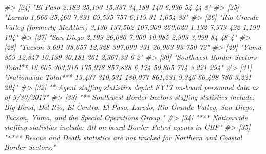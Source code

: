 \documentclass[
  12pt,
]{book}
\newenvironment{Shaded}{\begin{snugshade}}{\end{snugshade}}
\newcommand{\CommentTok}[1]{\textcolor[rgb]{0.37,0.37,0.37}{\textit{#1}}}
\begin{document}
\begin{Shaded}
\begin{Highlighting}[]
\CommentTok{\#> [24] "El Paso                                          2,182             25,193                   15,337                  34,189             140             6,996             54            44      8"    }
\CommentTok{\#> [25] "Laredo                                           1,666             25,460                    7,891                  69,535             757             6,119             31          1,054    83"    }
\CommentTok{\#> [26] "Rio Grande Valley (formerly McAllen)             3,130            137,562                  107,909                260,020             1,192            7,979            422          1,190   104"    }
\CommentTok{\#> [27] "San Diego                                        2,199             26,086                    7,060                  10,985            2,903            3,099             84            48      4"    }
\CommentTok{\#> [28] "Tucson                                           3,691             38,657                   12,328                397,090              331            20,963             93           750     72"    }
\CommentTok{\#> [29] "Yuma                                              859              12,847                   10,139                  30,181             261             2,367             33             6      2"    }
\CommentTok{\#> [30] "Southwest Border Sectors Total**                16,605            303,916                  175,978                857,888             6,174           59,805            774          3,221   294"    }
\CommentTok{\#> [31] "Nationwide Total***                             19,437            310,531                  180,077                861,231             9,346           60,498            786          3,221   294"    }
\CommentTok{\#> [32] "* Agent staffing statistics depict FY17 on{-}board personnel data as of 9/30/2017"                                                                                                                     }
\CommentTok{\#> [33] "** Southwest Border Sectors staffing statistics include: Big Bend, Del Rio, El Centro, El Paso, Laredo, Rio Grande Valley, San Diego, Tucson, Yuma, and the Special Operations Group."               }
\CommentTok{\#> [34] "*** Nationwide staffing statistics include: All on{-}board Border Patrol agents in CBP"                                                                                                                }
\CommentTok{\#> [35] "**** Rescue and Death statistics are not tracked for Northern and Coastal Border Sectors."}
\end{Highlighting}
\end{Shaded}
\end{document}
